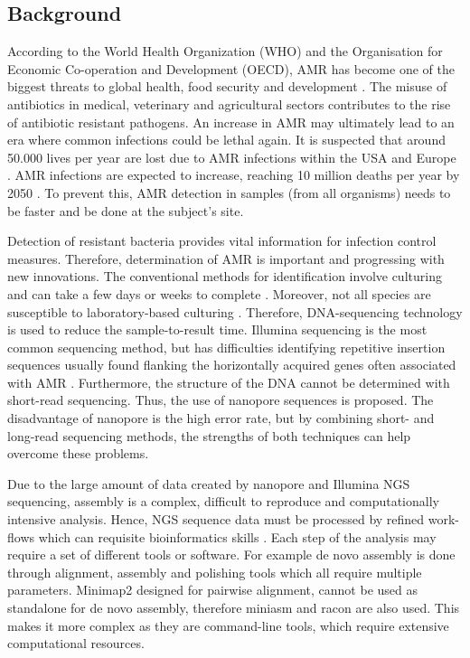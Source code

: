 \documentclass[a4paper,num-refs]{oup-contemporary}
\begin{document}
\subsection{Background}
According to the World Health Organization (WHO) and the Organisation for Economic Co-operation and Development (OECD), AMR has become one of the biggest threats to global health, food security and development \cite{OrganisationforEconomicCo-operationandDevelopment2017, WorldHealthOrganization2018}. The misuse of antibiotics in medical, veterinary and agricultural sectors contributes to the rise of antibiotic resistant pathogens. An increase in AMR may ultimately lead to an era where common infections could be lethal again. It is suspected that around 50.000 lives per year are lost due to AMR infections within the USA and Europe \cite{Simlai2016}. AMR infections are expected to increase, reaching 10 million deaths per year by 2050 \cite{ONeil2014}. To prevent this, AMR detection in samples (from all organisms) needs to be faster and be done at the subject's site.

Detection of resistant bacteria provides vital information for infection control measures. Therefore, determination of AMR is important and progressing with new innovations. The conventional methods for identification involve culturing and can take a few days or weeks to complete \cite{Quick2015}. Moreover, not all species are susceptible to laboratory-based culturing \cite{Mitsuhashi2017}. Therefore, DNA-sequencing technology is used to reduce the sample-to-result time. Illumina sequencing is the most common sequencing method, but has difficulties identifying repetitive insertion sequences usually found flanking the horizontally acquired genes often associated with AMR \cite{Ashton2014}. Furthermore, the structure of the DNA cannot be determined with short-read sequencing. Thus, the use of nanopore sequences is proposed. The disadvantage of nanopore is the high error rate, but by combining short- and long-read sequencing methods, the strengths of both techniques can help overcome these problems.

Due to the large amount of data created by nanopore and Illumina NGS sequencing, assembly is a complex, difficult to reproduce and computationally intensive analysis. Hence, NGS sequence data must be processed by refined work-flows which can requisite bioinformatics skills \cite{Hemlata2016}. Each step of the analysis may require a set of different tools or software. For example de novo assembly is done through alignment, assembly and polishing tools which all require multiple parameters. Minimap2 designed for pairwise alignment, cannot be used as standalone for de novo assembly, therefore miniasm and racon are also used. This makes it more complex as they are command-line tools, which require extensive computational resources. 
\end{document}
